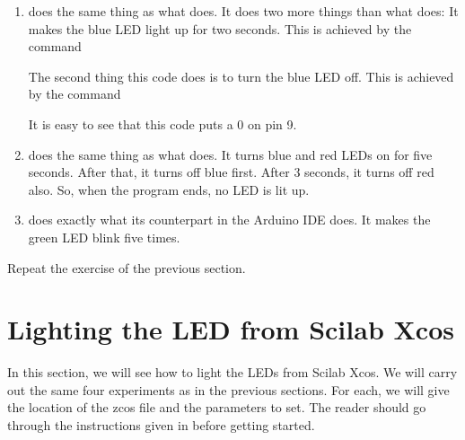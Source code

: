 \begin{enumerate}
\item {} does the same thing as what
   does.  It does two more things than what
   does: It makes the blue LED light up for two
  seconds.  This is achieved by the command
  
  The second thing this code does is to turn the blue LED off.  This
  is achieved by the command
  
  It is easy to see that this code puts a 0 on pin 9.

\item {} does the same thing as what
   does.  It turns blue and red LEDs on for
  five seconds.  After that, it turns off blue first.  After 3
  seconds, it turns off red also.  So, when the program ends, no LED is
  lit up.

\item {} does exactly what its counterpart
  in the Arduino IDE does.  It makes the green LED blink five times.
\end{enumerate}

\begin{exercise}
Repeat the exercise of the previous section.
\end{exercise}

\section{Lighting the LED from Scilab Xcos}
\label{sec:light-xcos}
In this section, we will see how to light the LEDs from Scilab Xcos.
We will carry out the same four experiments as in the previous
sections.  For each, we will give the location
of the zcos file and the parameters to set.  The reader should go
through the instructions given in  before
getting started.

